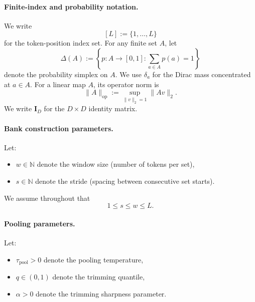 \documentclass{article}
\theoremstyle{plain}
\theoremstyle{definition}
\theoremstyle{remark}
\begin{document}
\paragraph{Finite-index and probability notation.}
We write
\[
[L]:=\{1,\dots,L\}
\]
for the token-position index set. For any finite set $A$, let
\[
\Delta(A)
:=
\left\{
p:A\to[0,1]:
\sum_{a\in A} p(a)=1
\right\}
\]
denote the probability simplex on $A$. We use $\delta_a$ for the Dirac mass
concentrated at $a\in A$.
For a linear map $A$, its operator norm is
\[
\|A\|_{\mathrm{op}}:=\sup_{\|v\|_2=1}\|Av\|_2.
\]
We write $\mathbf I_D$ for the $D\times D$ identity matrix.

\paragraph{Bank construction parameters.}
Let:
\begin{itemize}
    \item $w \in \mathbb{N}$ denote the window size (number of tokens per set),
    \item $s \in \mathbb{N}$ denote the stride (spacing between consecutive set starts).
\end{itemize}
We assume throughout that
\begin{equation}
\label{eq:ws-order}
1 \le s \le w \le L.
\end{equation}

\paragraph{Pooling parameters.}
Let:
\begin{itemize}
    \item $\tau_{\mathrm{pool}} > 0$ denote the pooling temperature,
    \item $q \in (0,1)$ denote the trimming quantile,
    \item $\alpha > 0$ denote the trimming sharpness parameter.
\end{itemize}
\end{document}
